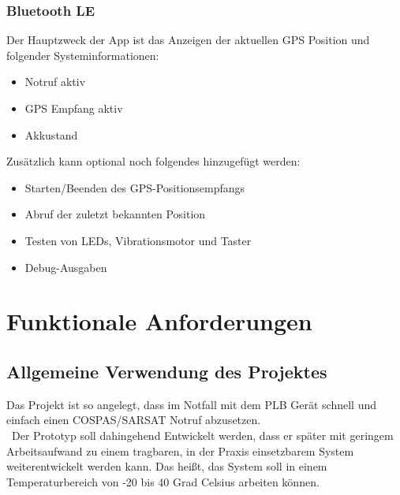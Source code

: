 \subsubsection{Bluetooth LE}

Der Hauptzweck der App ist das Anzeigen der aktuellen GPS Position und folgender Systeminformationen:
\begin{itemize}
	\item Notruf aktiv
	\item GPS Empfang aktiv
	\item Akkustand
\end{itemize}

Zusätzlich kann optional noch folgendes hinzugefügt werden:

\begin{itemize}
	\item Starten/Beenden des GPS-Positionsempfangs
	\item Abruf der zuletzt bekannten Position
	\item Testen von LEDs, Vibrationsmotor und Taster
	\item Debug-Ausgaben
\end{itemize}

\newpage

\section{Funktionale Anforderungen}
\subsection{Allgemeine Verwendung des Projektes}
Das Projekt ist so angelegt, dass im Notfall mit dem PLB Gerät schnell und einfach einen COSPAS/SARSAT Notruf abzusetzen. \\\
Der Prototyp soll dahingehend Entwickelt werden, dass er später mit geringem Arbeitsaufwand zu einem tragbaren, in der Praxis einsetzbarem System weiterentwickelt werden kann.
Das heißt, das System soll in einem Temperaturbereich von -20 bis 40 Grad Celsius arbeiten können.
